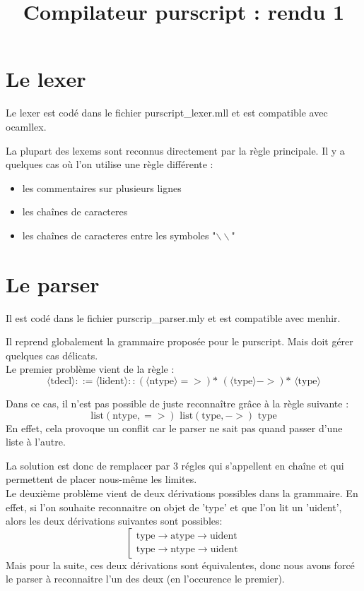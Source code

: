 \documentclass[12pt,a4paper,french]{article}
\title{Compilateur purscript : rendu 1}
\begin{document}
\maketitle

\part*{Le lexer}
Le lexer est codé dans le fichier purscript\_lexer.mll et est compatible avec ocamllex.

La plupart des lexems sont reconnus directement par la règle principale. Il y a quelques cas où l'on utilise une règle différente :

\begin{itemize}
\item les commentaires sur plusieurs lignes
\item les chaînes de caracteres
\item les chaînes de caracteres entre les symboles "$\backslash\backslash$"
\end{itemize}


\part*{Le parser}
Il est codé dans le fichier purscrip\_parser.mly et est compatible avec menhir.

Il reprend globalement la grammaire proposée pour le purscript. Mais doit gérer quelques cas délicats. \\

Le premier problème vient de la règle :
\[ \langle\text{tdecl}\rangle ::= \langle \text{lident}\rangle :: (\langle\text{ntype}\rangle =>)\text{* } (\langle\text{type}\rangle ->)\text{* } \langle\text{type}\rangle \]

Dans ce cas, il n'est pas possible de juste reconnaître grâce à la règle suivante :
\[  \text{list}(\text{ntype}, =>) \text{ list}(\text{type}, ->) \text{ type} \]
En effet, cela provoque un conflit car le parser ne sait pas quand passer d'une liste à l'autre.

La solution est donc de remplacer par 3 régles qui s'appellent en chaîne et qui permettent de placer nous-même les limites.
\\
Le deuxième problème vient de deux dérivations possibles dans la grammaire. En effet, si l'on souhaite reconnaitre on objet de 'type' et que l'on lit un 'uident', alors les deux dérivations suivantes sont possibles:
\[ \left[ \begin{array}{l}
	\text{type} \rightarrow \text{atype} \rightarrow \text{uident} \\
	\text{type} \rightarrow \text{ntype} \rightarrow \text{uident}
\end{array} \right.
\]
Mais pour la suite, ces deux dérivations sont équivalentes, donc nous avons forcé le parser à reconnaitre l'un des deux (en l'occurence le premier).
\end{document}
